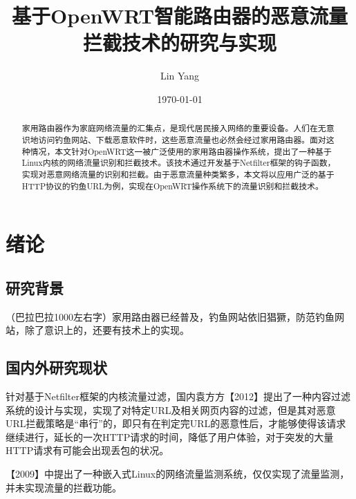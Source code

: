 \documentclass[a4paper,onecolumn,UTF8]{ctexart}
\title{基于OpenWRT智能路由器的恶意流量拦截技术的研究与实现}
\author{Lin Yang}
\date{\today}
\begin{document}
\tableofcontents
\maketitle
\begin{abstract}
  家用路由器作为家庭网络流量的汇集点，是现代居民接入网络的重要设备。人们在无意识地访问钓鱼网站、下载恶意软件时，这些恶意流量也必然会经过家用路由器。面对这种情况，本文针对OpenWRT这一被广泛使用的家用路由器操作系统，提出了一种基于Linux内核的网络流量识别和拦截技术。该技术通过开发基于Netfilter框架的钩子函数，实现对恶意网络流量的识别和拦截。由于恶意流量种类繁多，本文将以应用广泛的基于HTTP协议的钓鱼URL为例，实现在OpenWRT操作系统下的流量识别和拦截技术。
\end{abstract}
\section{绪论}
\subsection{研究背景}
（巴拉巴拉1000左右字）家用路由器已经普及，钓鱼网站依旧猖獗，防范钓鱼网站，除了意识上的，还要有技术上的实现。
\subsection{国内外研究现状}
针对基于Netfilter框架的内核流量过滤，国内袁方方【2012】提出了一种内容过滤系统的设计与实现，实现了对特定URL及相关网页内容的过滤，但是其对恶意URL拦截策略是“串行”的，即只有在判定完URL的恶意性后，才能够使得该请求继续进行，延长的一次HTTP请求的时间，降低了用户体验，对于突发的大量HTTP请求有可能会出现丢包的状况。
\par{}【2009】中提出了一种嵌入式Linux的网络流量监测系统，仅仅实现了流量监测，并未实现流量的拦截功能。
\end{document}
